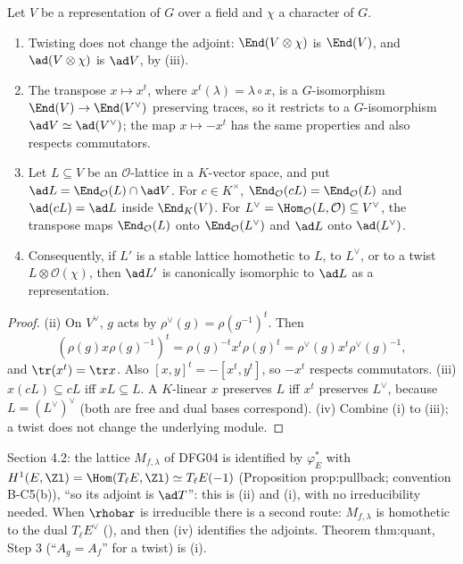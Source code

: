 \begin{proposition}\label{prop:reps:adjoint-invariance}
Let $V$ be a representation of $G$ over a field and $\chi$ a character of $G$.
\begin{enumerate}[label=(\roman*)]
\item Twisting does not change the adjoint: $\End(V\otimes\chi)$ is $\End(V)$, and $\ad(V\otimes\chi)$ is $\ad V$, by
(iii).
\item The transpose $x\mapsto x^t$, where $x^t(\lambda)=\lambda\circ x$, is a $G$-isomorphism $\End(V)\to\End(V^\vee)$ preserving traces, so it restricts to a
$G$-isomorphism $\ad V\simeq\ad(V^\vee)$; the map $x\mapsto-x^t$ has the same properties and also respects commutators.
\item Let $L\subseteq V$ be an $\mathcal{O}$-lattice in a $K$-vector space, and put $\ad L=\End_\mathcal{O}(L)\cap\ad V$. For $c\in K^\times$, $\End_\mathcal{O}(cL)=\End_\mathcal{O}(L)$ and
$\ad(cL)=\ad L$ inside $\End_K(V)$. For $L^\vee=\Hom_\mathcal{O}(L,\mathcal{O})\subseteq V^\vee$, the transpose maps $\End_\mathcal{O}(L)$ onto $\End_\mathcal{O}(L^\vee)$ and $\ad L$ onto
$\ad(L^\vee)$.
\item Consequently, if $L'$ is a stable lattice homothetic to $L$, to $L^\vee$, or to a twist $L\otimes\mathcal{O}(\chi)$, then $\ad L'$ is canonically isomorphic to
$\ad L$ as a representation.
\end{enumerate}
\end{proposition}

\begin{proof}
(ii) On $V^\vee$, $g$ acts by $\rho^\vee(g)=\rho(g^{-1})^t$. Then
\[
(\rho(g)x\rho(g)^{-1})^t=\rho(g)^{-t}x^t\rho(g)^t=\rho^\vee(g)x^t\rho^\vee(g)^{-1},
\]
and $\tr(x^t)=\tr x$.
Also $[x,y]^t=-[x^t,y^t]$, so $-x^t$ respects commutators. (iii) $x(cL)\subseteq cL$ iff $xL\subseteq L$. A $K$-linear $x$ preserves $L$ iff $x^t$ preserves
$L^\vee$, because $L=(L^\vee)^\vee$ (both are free and dual bases correspond). (iv) Combine (i) to (iii); a twist does not change the
underlying module.
\end{proof}

\begin{paperlink}
Section 4.2: the lattice $M_{f,\lambda}$ of DFG04 is identified by $\varphi_E^*$ with $H^1(E,\Zl)=\Hom(T_\ell E,\Zl)\simeq T_\ell E(-1)$ (Proposition prop:pullback;
convention B-C5(b)), ``so its adjoint is $\ad T$'': this is (ii) and (i), with no irreducibility needed. When $\rhobar$ is irreducible there is
a second route: $M_{f,\lambda}$ is homothetic to the dual $T_\ell E^\vee$ (), and then (iv) identifies the adjoints. Theorem thm:quant,
Step 3 (``$A_g=A_f$'' for a twist) is (i).
\end{paperlink}

